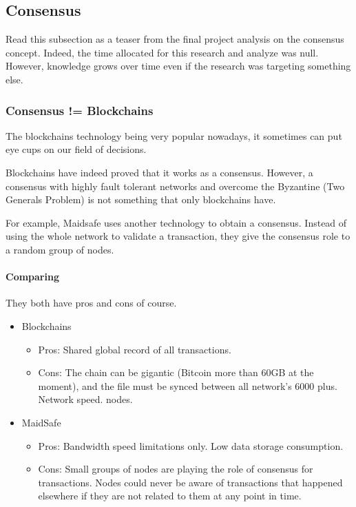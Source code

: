 
\subsection{Consensus}
Read this subsection as a teaser from the final project analysis on the consensus concept. Indeed, the time allocated for this research and analyze was null. However, knowledge grows over time even if the research was targeting something else.

\subsubsection{Consensus != Blockchains}
The blockchains technology being very popular nowadays, it sometimes can put eye cups on our field of decisions.

Blockchains have indeed proved that it works as a consensus. However, a consensus with highly fault tolerant networks and overcome the Byzantine (Two Generals Problem) is not something that only blockchains have.

For example, Maidsafe\cite{MaidSafe2014MaidSafe.netCommunity} uses another technology to obtain a consensus\cite{Nick2015CONSENSUSBLOCKCHAIN}. Instead of using the whole network to validate a transaction, they give the consensus role to a random group of nodes.

\paragraph{Comparing} They both have pros and cons of course.
\begin{itemize}
\item Blockchains
\begin{itemize}
\item Pros: Shared global record of all transactions.
\item Cons: The chain can be gigantic (Bitcoin more than 60GB at the moment), and the file must be synced between all network’s 6000 plus. Network speed. nodes\cite{AyeowchGLOBALDISTRIBUTION}.
\end{itemize}
\end{itemize}
\begin{itemize}
\item MaidSafe
\begin{itemize}
\item Pros: Bandwidth speed limitations only. Low data storage consumption.
\item Cons: Small groups of nodes are playing the role of consensus for transactions. Nodes could never be aware of transactions that happened elsewhere if they are not related to them at any point in time.
\end{itemize}
\end{itemize}

